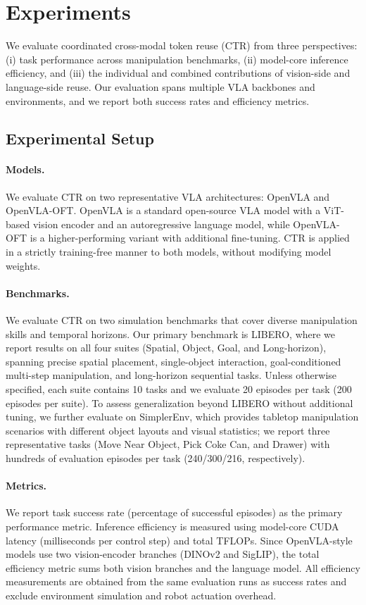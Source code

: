 \documentclass[11pt]{article}
\begin{document}
\section{Experiments}
We evaluate coordinated cross-modal token reuse (CTR) from three perspectives: (i) task performance across manipulation benchmarks, (ii) model-core inference efficiency, and (iii) the individual and combined contributions of vision-side and language-side reuse. Our evaluation spans multiple VLA backbones and environments, and we report both success rates and efficiency metrics.


\subsection{Experimental Setup}

\paragraph{Models.}
We evaluate CTR on two representative VLA architectures: OpenVLA and OpenVLA-OFT. OpenVLA is a standard open-source VLA model with a ViT-based vision encoder and an autoregressive language model, while OpenVLA-OFT is a higher-performing variant with additional fine-tuning. CTR is applied in a strictly training-free manner to both models, without modifying model weights.


\paragraph{Benchmarks.}
We evaluate CTR on two simulation benchmarks that cover diverse manipulation skills and temporal horizons. Our primary benchmark is LIBERO, where we report results on all four suites (Spatial, Object, Goal, and Long-horizon), spanning precise spatial placement, single-object interaction, goal-conditioned multi-step manipulation, and long-horizon sequential tasks. Unless otherwise specified, each suite contains 10 tasks and we evaluate 20 episodes per task (200 episodes per suite). To assess generalization beyond LIBERO without additional tuning, we further evaluate on SimplerEnv, which provides tabletop manipulation scenarios with different object layouts and visual statistics; we report three representative tasks (Move Near Object, Pick Coke Can, and Drawer) with hundreds of evaluation episodes per task (240/300/216, respectively).

\paragraph{Metrics.}
We report task success rate (percentage of successful episodes) as the primary performance metric. Inference efficiency is measured using model-core CUDA latency (milliseconds per control step) and total TFLOPs. Since OpenVLA-style models use two vision-encoder branches (DINOv2 and SigLIP), the total efficiency metric sums both vision branches and the language model. All efficiency measurements are obtained from the same evaluation runs as success rates and exclude environment simulation and robot actuation overhead.
\end{document}
